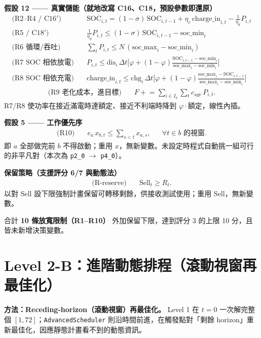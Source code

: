 \documentclass[12pt,a4paper,fontset=none]{ctexart}
\newcommand{\fn}[1]{\texttt{\small #1}}
\begin{document}
\noindent\textbf{假設 12 —— 真實儲能（就地改寫 C16、C18，預設參數即還原）}
\begin{align}
\text{(R2--R4 / C16$'$)}\quad & \mathrm{SOC}_{i,t}=(1-\sigma)\,\mathrm{SOC}_{i,t-1}+\eta_c\,\mathrm{charge\_in}_{i,t}-\tfrac{1}{\eta_d}P_{i,t} \\
\text{(R5 / C18$'$)}\quad & \tfrac{1}{\eta_d}P_{i,t}\le (1-\sigma)\,\mathrm{SOC}_{i,t-1}-\mathrm{soc\_min}_i \\
\text{(R6 循環/吞吐)}\quad & \textstyle\sum_{t}P_{i,t}\le N\,(\mathrm{soc\_max}_i-\mathrm{soc\_min}_i) \\
\text{(R7 SOC 相依放電)}\quad & P_{i,t}\le \mathrm{dis}_i\,\Delta t\Big[\varphi+(1-\varphi)\tfrac{\mathrm{SOC}_{i,t-1}-\mathrm{soc\_min}_i}{\mathrm{soc\_max}_i-\mathrm{soc\_min}_i}\Big] \\
\text{(R8 SOC 相依充電)}\quad & \mathrm{charge\_in}_{i,t}\le \mathrm{chg}_i\,\Delta t\Big[\varphi+(1-\varphi)\tfrac{\mathrm{soc\_max}_i-\mathrm{SOC}_{i,t-1}}{\mathrm{soc\_max}_i-\mathrm{soc\_min}_i}\Big]
\end{align}
\begin{align}
\text{(R9 老化成本，進目標)}\quad & F \mathrel{+}= \sum_{i\in I_b}\sum_{t}c_{\text{age}}\,P_{i,t} .
\end{align}
R7/R8 使功率在接近滿電時達額定、接近不利端時降到 $\varphi\cdot$額定，線性內插。

\noindent\textbf{假設 5 —— 工作優先序}
\begin{align}
\text{(R10)}\quad & e_a\, x_{b,t}\le \sum_{s<t}x_{a,s}, && \forall t\in b\text{ 的視窗}.
\end{align}
即 $a$ 全部做完前 $b$ 不得啟動；重用 $x$，無新變數。未設定時程式自動挑一組可行的非平凡對（本次為 \fn{p2\_0} $\to$ \fn{p4\_0}）。

\noindent\textbf{保留策略（支援評分 6/7 與動態法）}
\begin{align}
\text{(R-reserve)}\quad & \mathrm{Sell}_t\ge R_t .
\end{align}
以對 $\mathrm{Sell}$ 設下限強制計畫保留可轉移剩餘，供接收測試使用；重用 $\mathrm{Sell}$，無新變數。

\medskip
\noindent 合計 \textbf{10 條放寬限制（R1--R10）} 外加保留下限，達到評分 3 的上限 10 分，且皆未新增決策變數。

\section{Level 2-B：進階動態排程（滾動視窗再最佳化）}
\textbf{方法：Receding-horizon（滾動視窗）再最佳化。} Level 1 在 $t=0$ 一次解完整個 $[1,72]$；\fn{AdvancedScheduler} 則沿時間前進，在觸發點對「剩餘 horizon」重新最佳化，因應靜態計畫看不到的動態資訊。
\end{document}
